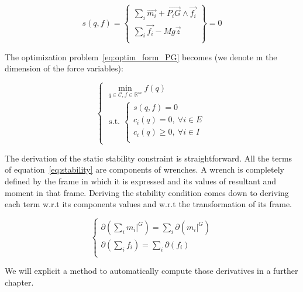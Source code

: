 \begin{equation}
  \boxed{s(q,f) = \left\{
  \begin{array}{r}
    \sum\limits_i \vec{m_i} + \overrightarrow{P_i G}\wedge \vec{f_i} \\
    \sum\limits_i \vec{f_i} - Mg\vec{z} \\
  \end{array}
  \right\}
  = 0}
\end{equation}

The optimization problem~\ref{eq:optim_form_PG} becomes (we denote m the dimension of the force variables):

\begin{equation}
\label{eq:optim_form_PG_with_stab}
  \left\{
  \begin{array}{l}
    \min\limits_{q\in\mathcal{C}, f\in \mathbb{R}^m}{f(q)}\\
    \text{ s.t. }
    \left\{
    \begin{array}{l}
      s(q,f) = 0\\
      c_i(q) = 0,\ \forall i\in{E}\\
      c_i(q) \geq 0,\ \forall i\in{I}\\
    \end{array}
    \right.
  \end{array}
  \right.
\end{equation}

The derivation of the static stability constraint is straightforward.
All the terms of equation~\ref{eq:stability} are components of wrenches.
A wrench is completely defined by the frame in which it is expressed and its values of resultant and moment in that frame.
Deriving the stability condition comes down to deriving each term w.r.t its components values and w.r.t the transformation of its frame.

\begin{equation}
\left\{
\begin{array}{r}
  \partial\left(\sum\limits_i m_i|^G\right) = \sum\limits_i \partial(m_i|^G) \\
  \partial\left(\sum\limits_i f_i\right) = \sum\limits_i \partial(f_i) \\
\end{array}
\right.
\label{eq:derivation_stability}
\end{equation}

We will explicit a method to automatically compute those derivatives in a further chapter.



